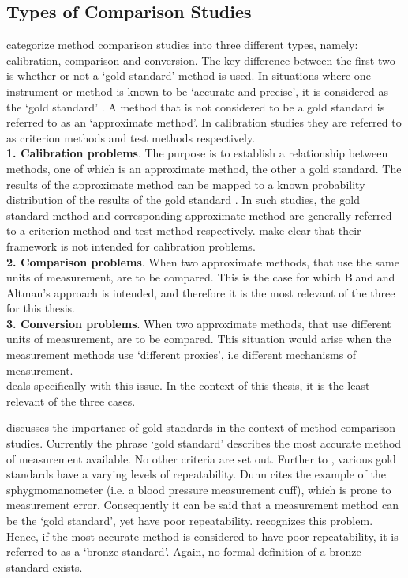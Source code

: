 \documentclass[12pt, a4paper]{report}
\theoremstyle{plain}
\theoremstyle{definition}
\theoremstyle{remark}
\begin{document}
	\subsection{Types of Comparison Studies}
	\citet{lewis1991} categorize method comparison studies into three
	different types, namely: calibration, comparison and conversion. The key difference between the first two is
	whether or not a `gold standard' method is used. In situations
	where one instrument or method is known to be `accurate and
	precise', it is considered as the `gold standard' \citep{lewis1991}. A
	method that is not considered to be a gold standard is referred to
	as an `approximate method'. In calibration studies they are
	referred to as criterion methods and test methods respectively.\\
	\smallskip
	\textbf{1. Calibration problems}. The purpose is to establish a
	relationship between methods, one of which is an approximate
	method, the other a gold standard. The results of the approximate
	method can be mapped to a known probability distribution of the
	results of the gold standard \citep{lewis1991}. In such studies, the gold standard method and corresponding approximate method are
	generally referred to a criterion method and test method
	respectively. \citet*{BA83} make clear that their framework is
	not intended for calibration problems.\\
	\smallskip \textbf{2. Comparison problems}. When two approximate
	methods, that use the same units of measurement, are to be compared. This is the case for which Bland and Altman's approach is intended, and therefore it is the most relevant of
	the three for this thesis.\\
	\smallskip \textbf{3. Conversion problems}. When two approximate
	methods, that use different units of measurement, are to be
	compared. This situation would arise when the measurement methods
	use `different proxies', i.e different mechanisms of measurement.\\
	\smallskip
	\citet{lewis1991} deals specifically with this issue. In the context
	of this thesis, it is the least relevant of the three cases.
	
	
	
	\citet{Aroy2015} discusses the importance of gold standards in the context of method comparison studies.
	Currently the phrase `gold standard' describes the most accurate method of measurement available. No other criteria are set out. Further to \citet{DunnSEME}, various gold standards have a varying levels of repeatability. Dunn cites the example of the sphygmomanometer (i.e. a blood pressure measurement cuff), which is prone to measurement error. Consequently it can be said that a measurement method can be the `gold standard', yet have poor repeatability. \citet{DunnSEME} recognizes this problem. Hence, if the most accurate method is considered to have poor repeatability, it is referred to as a `bronze standard'.  Again, no formal definition of a bronze standard exists.
	
\end{document}
